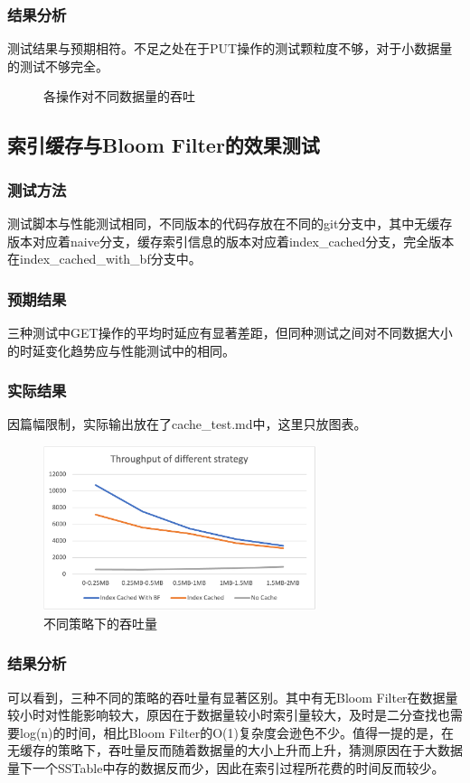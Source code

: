 \documentclass{ctexart}
\begin{document}
\subsubsection{结果分析}
测试结果与预期相符。不足之处在于PUT操作的测试颗粒度不够，对于小数据量的测试不够完全。
\begin{figure}[h!]
  \centering
  \caption{各操作对不同数据量的吞吐}
\end{figure}


\subsection{索引缓存与Bloom Filter的效果测试}

\subsubsection{测试方法}
测试脚本与性能测试相同，不同版本的代码存放在不同的git分支中，其中无缓存版本对应着naive分支，缓存索引信息的版本对应着index\_cached分支，完全版本在index\_cached\_with\_bf分支中。

\subsubsection{预期结果}
三种测试中GET操作的平均时延应有显著差距，但同种测试之间对不同数据大小的时延变化趋势应与性能测试中的相同。

\subsubsection{实际结果}
因篇幅限制，实际输出放在了cache\_test.md中，这里只放图表。
\begin{figure}[h!]
  \centering
  \includegraphics[width=8cm]{Strategy.png}
  \caption{不同策略下的吞吐量}
\end{figure}

\subsubsection{结果分析}
可以看到，三种不同的策略的吞吐量有显著区别。其中有无Bloom Filter在数据量较小时对性能影响较大，原因在于数据量较小时索引量较大，及时是二分查找也需要log(n)的时间，相比Bloom Filter的O(1)复杂度会逊色不少。值得一提的是，在无缓存的策略下，吞吐量反而随着数据量的大小上升而上升，猜测原因在于大数据量下一个SSTable中存的数据反而少，因此在索引过程所花费的时间反而较少。
\end{document}
